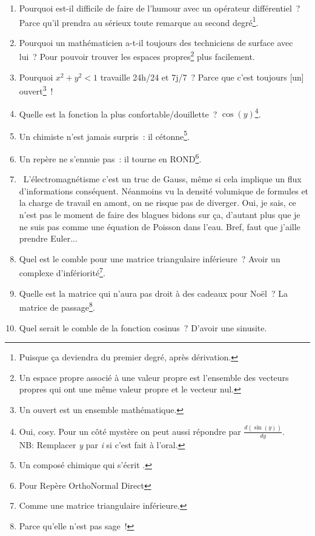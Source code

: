 \documentclass[10pt,a5paper,fullpage]{book}
\begin{document}
\begin{enumerate}
		\item Pourquoi est-il difficile de faire de l’humour avec un opérateur différentiel~? Parce qu’il prendra au sérieux toute remarque au second degré\footnote{Puisque ça deviendra du premier degré, après dérivation.}.
		\item Pourquoi un mathématicien a-t-il toujours des techniciens de surface avec lui~? Pour pouvoir trouver les espaces propres\footnote{Un espace propre associé à une valeur propre est l'ensemble des vecteurs propres qui ont une même valeur propre et le vecteur nul.} plus facilement.
		\item Pourquoi $x^{2}+y^{2} < 1$ travaille 24h/24 et 7j/7~? Parce que c’est toujours [un] ouvert\footnote{Un ouvert est un ensemble mathématique.}~!
		\item Quelle est la fonction la plus confortable/douillette~? $\cos(y)$\footnote{Oui, cosy. Pour un côté mystère on peut aussi répondre par $\frac{d(\sin({y}))}{dy}$. \\NB: Remplacer \textit{y} par \textit{i} si c’est fait à l’oral.}. 
		\item Un chimiste n’est jamais surpris~: il cétonne\footnote{Un composé chimique qui s’écrit .}.
		\item Un repère ne s’ennuie pas~: il tourne en ROND\footnote{Pour Repère OrthoNormal Direct}.
		\item \guillemotleft~L'électromagnétisme c'est un truc de Gauss, même si cela implique un flux d'informations conséquent. Néanmoins vu la densité volumique de formules et la charge de travail en amont, on ne risque pas de diverger. Oui, je sais, ce n’est pas le moment de faire des blagues bidons sur ça, d'autant plus que je ne suis pas comme une équation de Poisson dans l'eau. Bref, faut que j'aille prendre Euler...~\guillemotright
		\item Quel est le comble pour une matrice triangulaire inférieure~? Avoir un complexe d’infériorité\footnote{Comme une matrice triangulaire inférieure.}.
		\item Quelle est la matrice qui n’aura pas droit à des cadeaux pour Noël~? La matrice de passage\footnote{Parce qu’elle n’est pas sage~!}.
		\item Quel serait le comble de la fonction cosinus~? D’avoir une sinusite.

\end{enumerate}
\end{document}
